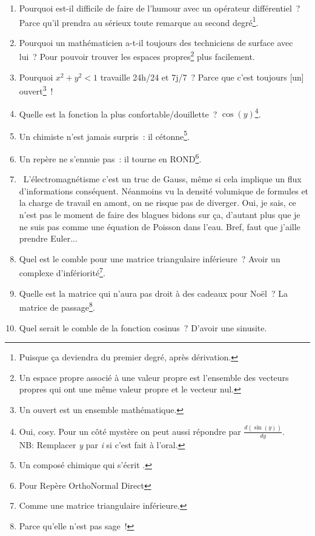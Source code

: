 \documentclass[10pt,a5paper,fullpage]{book}
\begin{document}
\begin{enumerate}
		\item Pourquoi est-il difficile de faire de l’humour avec un opérateur différentiel~? Parce qu’il prendra au sérieux toute remarque au second degré\footnote{Puisque ça deviendra du premier degré, après dérivation.}.
		\item Pourquoi un mathématicien a-t-il toujours des techniciens de surface avec lui~? Pour pouvoir trouver les espaces propres\footnote{Un espace propre associé à une valeur propre est l'ensemble des vecteurs propres qui ont une même valeur propre et le vecteur nul.} plus facilement.
		\item Pourquoi $x^{2}+y^{2} < 1$ travaille 24h/24 et 7j/7~? Parce que c’est toujours [un] ouvert\footnote{Un ouvert est un ensemble mathématique.}~!
		\item Quelle est la fonction la plus confortable/douillette~? $\cos(y)$\footnote{Oui, cosy. Pour un côté mystère on peut aussi répondre par $\frac{d(\sin({y}))}{dy}$. \\NB: Remplacer \textit{y} par \textit{i} si c’est fait à l’oral.}. 
		\item Un chimiste n’est jamais surpris~: il cétonne\footnote{Un composé chimique qui s’écrit .}.
		\item Un repère ne s’ennuie pas~: il tourne en ROND\footnote{Pour Repère OrthoNormal Direct}.
		\item \guillemotleft~L'électromagnétisme c'est un truc de Gauss, même si cela implique un flux d'informations conséquent. Néanmoins vu la densité volumique de formules et la charge de travail en amont, on ne risque pas de diverger. Oui, je sais, ce n’est pas le moment de faire des blagues bidons sur ça, d'autant plus que je ne suis pas comme une équation de Poisson dans l'eau. Bref, faut que j'aille prendre Euler...~\guillemotright
		\item Quel est le comble pour une matrice triangulaire inférieure~? Avoir un complexe d’infériorité\footnote{Comme une matrice triangulaire inférieure.}.
		\item Quelle est la matrice qui n’aura pas droit à des cadeaux pour Noël~? La matrice de passage\footnote{Parce qu’elle n’est pas sage~!}.
		\item Quel serait le comble de la fonction cosinus~? D’avoir une sinusite.

\end{enumerate}
\end{document}
